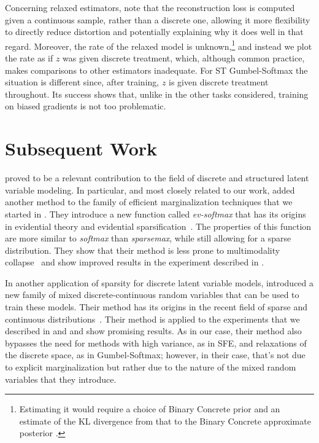 Concerning relaxed estimators, note that the reconstruction loss is
computed given a continuous sample, rather than a discrete one,
allowing it more flexibility to directly reduce distortion and
potentially explaining why it does well in that regard. Moreover, the
rate of the relaxed model is unknown,\footnote{Estimating it would
    require a choice of Binary Concrete prior and an estimate of the KL
    divergence from that to the Binary Concrete approximate posterior
    \citep[Appendix C.3.2]{Concrete}.} and instead we plot the rate as if
$z$ was given discrete treatment, which, although common practice,
makes comparisons to other estimators inadequate. For ST
Gumbel-Softmax the situation is different since, after training, $z$
is given discrete treatment throughout. Its success shows that,
unlike in the other tasks considered, training on biased gradients is
not too problematic.

\section{Subsequent Work}
\label{sec:subsequent}

\noindent \citet{correia2020procneurips} proved to be a relevant
contribution to the field of discrete and structured latent variable
modeling. In particular, and most closely related to our work,
\citet{chen2021EvidentialSoftmaxSparse} added another method to the
family of efficient marginalization techniques that we started in
\citet{correia2020procneurips}. They introduce a new
function called \emph{ev-softmax} that has its origins in evidential
theory and evidential sparsification~\citep{itkina2020evidential}.
The properties of this function are more similar to \emph{softmax}
than \emph{sparsemax}, while still allowing for a sparse
distribution. They show that their method is less prone to
multimodality collapse~\citep{itkina2020evidential} and show improved
results in the experiment described in .

In another application of sparsity for discrete latent variable
models, \citet{farinhas2022SparseCommunicationMixed} introduced a new
family of mixed discrete-continuous random variables that can be used
to train these models. Their method has its origins in the recent
field of sparse and continuous
distributions~\citep{martins2020SparseContinuousAttention}. Their
method is applied to the experiments that we described in
 and  and show promising
results. As in our case, their method also bypasses the need for
methods with high variance, as in SFE, and relaxations of the
discrete space, as in Gumbel-Softmax; however, in their case, that's
not due to explicit marginalization but rather due to the nature of
the mixed random variables that they introduce.

